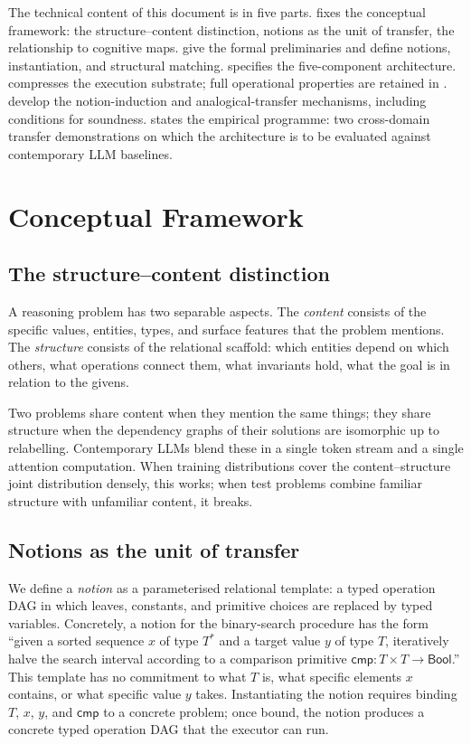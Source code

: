 \documentclass[11pt,a4paper]{article}
\theoremstyle{plain}
\theoremstyle{definition}
\theoremstyle{remark}
\begin{document}
The technical content of this document is in five parts.  fixes the conceptual framework: the structure--content distinction, notions as the unit of transfer, the relationship to cognitive maps.  give the formal preliminaries and define notions, instantiation, and structural matching.  specifies the five-component architecture.  compresses the execution substrate; full operational properties are retained in .  develop the notion-induction and analogical-transfer mechanisms, including conditions for soundness.  states the empirical programme: two cross-domain transfer demonstrations on which the architecture is to be evaluated against contemporary LLM baselines.

\section{Conceptual Framework}
\label{sec:conceptual}

\subsection{The structure--content distinction}

A reasoning problem has two separable aspects. The \emph{content} consists of the specific values, entities, types, and surface features that the problem mentions. The \emph{structure} consists of the relational scaffold: which entities depend on which others, what operations connect them, what invariants hold, what the goal is in relation to the givens.

Two problems share content when they mention the same things; they share structure when the dependency graphs of their solutions are isomorphic up to relabelling. Contemporary LLMs blend these in a single token stream and a single attention computation. When training distributions cover the content--structure joint distribution densely, this works; when test problems combine familiar structure with unfamiliar content, it breaks.

\subsection{Notions as the unit of transfer}

We define a \emph{notion} as a parameterised relational template: a typed operation DAG in which leaves, constants, and primitive choices are replaced by typed variables. Concretely, a notion for the binary-search procedure has the form ``given a sorted sequence $x$ of type $T^\ast$ and a target value $y$ of type $T$, iteratively halve the search interval according to a comparison primitive $\mathsf{cmp} : T \times T \to \mathsf{Bool}$.'' This template has no commitment to what $T$ is, what specific elements $x$ contains, or what specific value $y$ takes. Instantiating the notion requires binding $T$, $x$, $y$, and $\mathsf{cmp}$ to a concrete problem; once bound, the notion produces a concrete typed operation DAG that the executor can run.
\end{document}
